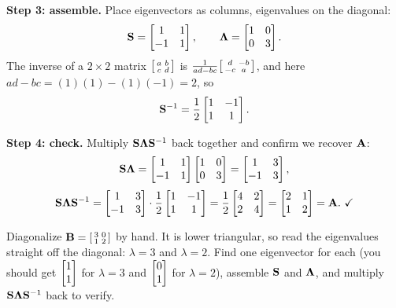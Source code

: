 \textbf{Step 3: assemble.} Place eigenvectors as columns, eigenvalues on the diagonal:
\[
  \mathbf{S} = \begin{bmatrix} 1 & 1 \\ -1 & 1 \end{bmatrix},
  \qquad
  \mathbf{\Lambda} = \begin{bmatrix} 1 & 0 \\ 0 & 3 \end{bmatrix}.
\]
The inverse of a $2\times2$ matrix $\begin{bsmallmatrix} a&b\\c&d\end{bsmallmatrix}$
is $\frac{1}{ad-bc}\begin{bsmallmatrix} d&-b\\-c&a\end{bsmallmatrix}$, and here
$ad-bc = (1)(1)-(1)(-1) = 2$, so
\[
  \mathbf{S}^{-1} = \frac{1}{2}\begin{bmatrix} 1 & -1 \\ 1 & 1 \end{bmatrix}.
\]

\textbf{Step 4: check.} Multiply $\mathbf{S}\mathbf{\Lambda}\mathbf{S}^{-1}$ back together
and confirm we recover $\mathbf{A}$:
\[
  \mathbf{S}\mathbf{\Lambda}
  = \begin{bmatrix} 1 & 1 \\ -1 & 1 \end{bmatrix}\begin{bmatrix} 1 & 0 \\ 0 & 3 \end{bmatrix}
  = \begin{bmatrix} 1 & 3 \\ -1 & 3 \end{bmatrix},
\]
\[
  \mat{S}\mat{\Lambda}\mat{S}\inv
  = \begin{bmatrix} 1 & 3 \\ -1 & 3 \end{bmatrix}\cdot\frac{1}{2}\begin{bmatrix} 1 & -1 \\ 1 & 1 \end{bmatrix}
  = \frac{1}{2}\begin{bmatrix} 4 & 2 \\ 2 & 4 \end{bmatrix}
  = \begin{bmatrix} 2 & 1 \\ 1 & 2 \end{bmatrix} = \mat{A}.\ \checkmark
\]

\begin{labbox}
Diagonalize $\mathbf{B} = \begin{bsmallmatrix} 3 & 0 \\ 1 & 2 \end{bsmallmatrix}$ by
hand. It is lower triangular, so read the eigenvalues straight off the diagonal:
$\lambda = 3$ and $\lambda = 2$. Find one eigenvector for each (you should get
$\begin{bmatrix}1\\1\end{bmatrix}$ for $\lambda=3$ and $\begin{bmatrix}0\\1\end{bmatrix}$ for $\lambda=2$), assemble
$\mathbf{S}$ and $\mathbf{\Lambda}$, and multiply $\mathbf{S}\mathbf{\Lambda}\mathbf{S}^{-1}$
back to verify.
\end{labbox}

